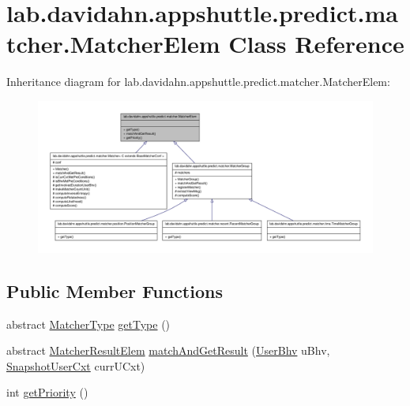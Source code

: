 \hypertarget{classlab_1_1davidahn_1_1appshuttle_1_1predict_1_1matcher_1_1_matcher_elem}{\section{lab.\-davidahn.\-appshuttle.\-predict.\-matcher.\-Matcher\-Elem \-Class \-Reference}
\label{classlab_1_1davidahn_1_1appshuttle_1_1predict_1_1matcher_1_1_matcher_elem}
}


\-Inheritance diagram for lab.\-davidahn.\-appshuttle.\-predict.\-matcher.\-Matcher\-Elem\-:
\nopagebreak
\begin{figure}[H]
\begin{center}
\leavevmode
\includegraphics[width=350pt]{classlab_1_1davidahn_1_1appshuttle_1_1predict_1_1matcher_1_1_matcher_elem__inherit__graph}
\end{center}
\end{figure}
\subsection*{\-Public \-Member \-Functions}
\begin{DoxyCompactItemize}
\item 
abstract \hyperlink{enumlab_1_1davidahn_1_1appshuttle_1_1predict_1_1matcher_1_1_matcher_type}{\-Matcher\-Type} \hyperlink{classlab_1_1davidahn_1_1appshuttle_1_1predict_1_1matcher_1_1_matcher_elem_a33ef905a01093c70af5250e99b37a596}{get\-Type} ()
\item 
abstract \hyperlink{classlab_1_1davidahn_1_1appshuttle_1_1predict_1_1matcher_1_1_matcher_result_elem}{\-Matcher\-Result\-Elem} \hyperlink{classlab_1_1davidahn_1_1appshuttle_1_1predict_1_1matcher_1_1_matcher_elem_aa0fb85df89fa0d75c017737509f8b343}{match\-And\-Get\-Result} (\hyperlink{interfacelab_1_1davidahn_1_1appshuttle_1_1collect_1_1bhv_1_1_user_bhv}{\-User\-Bhv} u\-Bhv, \hyperlink{classlab_1_1davidahn_1_1appshuttle_1_1collect_1_1_snapshot_user_cxt}{\-Snapshot\-User\-Cxt} curr\-U\-Cxt)
\item 
int \hyperlink{classlab_1_1davidahn_1_1appshuttle_1_1predict_1_1matcher_1_1_matcher_elem_ad30e6ceb0bb7033d891952dbfcd19cac}{get\-Priority} ()
\end{DoxyCompactItemize}


